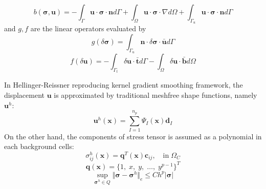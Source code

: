 \documentclass{article}
\begin{document}
\begin{equation}
    b(\boldsymbol \sigma,\boldsymbol u) = - \int_{\Gamma} \boldsymbol u \cdot \boldsymbol \sigma \cdot \boldsymbol n d\Gamma + \int_{\Omega} \boldsymbol u \cdot \boldsymbol \sigma \cdot \nabla d\Omega + \int_{\Gamma_u} \boldsymbol u \cdot \boldsymbol \sigma \cdot \boldsymbol n d\Gamma
\end{equation}
and $g,f$ are the linear operators evaluated by
\begin{equation}
    g(\delta \boldsymbol \sigma) = \int_{\Gamma_u} \boldsymbol n \cdot \delta \boldsymbol \sigma \cdot \bar{\boldsymbol u} d\Gamma
\end{equation}
\begin{equation}
    f(\delta \boldsymbol u) = - \int_{\Gamma_t} \delta \boldsymbol u \cdot \bar{\boldsymbol t} d\Gamma - \int_{\Omega} \delta \boldsymbol u \cdot \bar{\boldsymbol b} d\Omega
\end{equation} \par
In Hellinger-Reissner reproducing kernel gradient smoothing framework, the displacement $\boldsymbol u$ is approximated by traditional meshfree shape functions, namely $\boldsymbol u^h$:
\begin{equation}
    \boldsymbol u^h(\boldsymbol x) = \sum_{I=1}^{n_p} \Psi_I(\boldsymbol x) \boldsymbol d_I
\end{equation}
On the other hand, the components of stress tensor is assumed as a polynomial in each background cells:
\begin{equation}
    \sigma^h_{ij}(\boldsymbol x) = \boldsymbol q^T(\boldsymbol x) \boldsymbol c_{ij}, \quad \mathrm{in}\; \Omega_C
\end{equation}
\begin{equation}
    \boldsymbol q(\boldsymbol x) = \{1,\;x,\;y,\;\dots,\;y^{p-1}\}^T
\end{equation}
\begin{equation}
\sup_{\boldsymbol \sigma^h \in Q}\Vert \boldsymbol \sigma - \boldsymbol \sigma^h \Vert_{e} \le Ch^{p} \vert \boldsymbol \sigma \vert
\end{equation}
\end{document}
